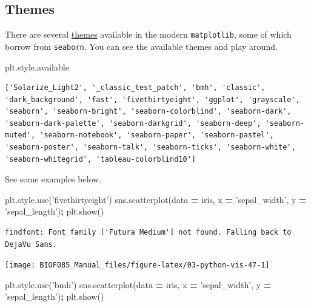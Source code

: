 \documentclass[
  letterpaper,
]{scrbook}
\newenvironment{Shaded}{\begin{snugshade}}{\end{snugshade}}
\newcommand{\NormalTok}[1]{#1}
\newcommand{\OperatorTok}[1]{\textcolor[rgb]{0.81,0.36,0.00}{\textbf{#1}}}
\newcommand{\StringTok}[1]{\textcolor[rgb]{0.31,0.60,0.02}{#1}}
\begin{document}
\hypertarget{themes}{%
\subsection{Themes}\label{themes}}

There are several \href{https://matplotlib.org/3.2.1/gallery/style_sheets/style_sheets_reference.html}{themes} available in the modern \texttt{matplotlib}, some of which borrow from \texttt{seaborn}. You can see the available themes and play around.

\begin{Shaded}
\begin{Highlighting}[]
\NormalTok{plt.style.available}
\end{Highlighting}
\end{Shaded}

\begin{verbatim}
['Solarize_Light2', '_classic_test_patch', 'bmh', 'classic', 'dark_background', 'fast', 'fivethirtyeight', 'ggplot', 'grayscale', 'seaborn', 'seaborn-bright', 'seaborn-colorblind', 'seaborn-dark', 'seaborn-dark-palette', 'seaborn-darkgrid', 'seaborn-deep', 'seaborn-muted', 'seaborn-notebook', 'seaborn-paper', 'seaborn-pastel', 'seaborn-poster', 'seaborn-talk', 'seaborn-ticks', 'seaborn-white', 'seaborn-whitegrid', 'tableau-colorblind10']
\end{verbatim}

See some examples below.

\begin{Shaded}
\begin{Highlighting}[]
\NormalTok{plt.style.use(}\StringTok{'fivethirtyeight'}\NormalTok{)}
\NormalTok{sns.scatterplot(data }\OperatorTok{=}\NormalTok{ iris, x }\OperatorTok{=} \StringTok{'sepal_width'}\NormalTok{, y }\OperatorTok{=} \StringTok{'sepal_length'}\NormalTok{)}\OperatorTok{;}
\NormalTok{plt.show()}
\end{Highlighting}
\end{Shaded}

\begin{verbatim}
findfont: Font family ['Futura Medium'] not found. Falling back to DejaVu Sans.
\end{verbatim}

\begin{center}\texttt{[image: BIOF085\_Manual\_files/figure-latex/03-python-vis-47-1]} \end{center}

\begin{Shaded}
\begin{Highlighting}[]
\NormalTok{plt.style.use(}\StringTok{'bmh'}\NormalTok{)}
\NormalTok{sns.scatterplot(data }\OperatorTok{=}\NormalTok{ iris, x }\OperatorTok{=} \StringTok{'sepal_width'}\NormalTok{, y }\OperatorTok{=} \StringTok{'sepal_length'}\NormalTok{)}\OperatorTok{;}
\NormalTok{plt.show()}
\end{Highlighting}
\end{Shaded}
\end{document}
